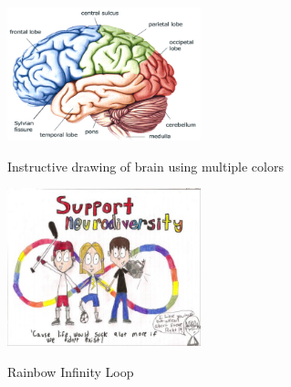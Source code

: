 \begin{figure}[ht]
\caption{Instructive drawing of brain using multiple colors}
\centering
\includegraphics[width=0.5\textwidth]{brainparts.png}
\label{fig:brainparts}
\end{figure}

\begin{figure}[ht]
\caption{Rainbow Infinity Loop}
\centering
\includegraphics[width=0.5\textwidth]{infinity.jpg}
\label{fig:infinity}
\end{figure}
